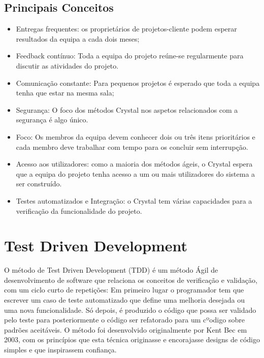 \subsection{Principais Conceitos}

\begin{itemize}

    \item Entregas frequentes: os proprietários de projetos-cliente podem esperar resultados da equipa a cada dois meses;
    \item Feedback contínuo: Toda a equipa do projeto reúne-se regularmente para discutir as atividades do projeto.
    \item Comunicação constante: Para pequenos projetos é esperado que toda a equipa tenha que estar na mesma sala;
    \item Segurança: O foco dos métodos Crystal nos aspetos relacionados com a segurança é algo único. 
    \item Foco: Os membros da equipa devem conhecer dois ou três itens prioritários e cada membro deve trabalhar com tempo para os concluir sem interrupção.
    \item Acesso aos utilizadores: como a maioria dos métodos ágeis, o Crystal espera que a equipa do projeto tenha acesso a um ou mais utilizadores do sistema a ser construído.
    \item Testes automatizados e Integração: o Crystal tem várias capacidades para a verificação da funcionalidade do projeto.
\end{itemize}

\newpage

\section{Test Driven Development}

O método de Test Driven Development (TDD) é um método Ágil de desenvolvimento de software que relaciona os conceitos de verificação e validação, com um ciclo curto de repetições: Em primeiro lugar o programador tem que escrever um caso de teste automatizado que define uma melhoria desejada ou uma nova funcionalidade. Só depois, é produzido o código que possa ser validado pelo teste para posteriormente o código ser refatorado para um cºodigo sobre padrões aceitáveis. O método foi desenvolvido originalmente por Kent Bec em 2003, com os princípios que esta técnica originasse e encorajasse designs de código simples e que inspirassem confiança.

